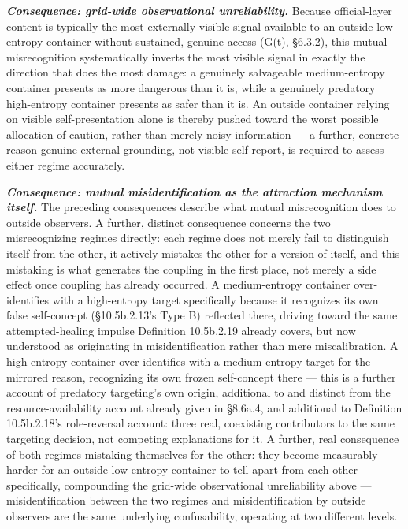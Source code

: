 \documentclass[
]{article}
\begin{document}
\emph{\textbf{Consequence: grid-wide observational unreliability.}}
Because official-layer content is typically the most externally visible
signal available to an outside low-entropy container without sustained,
genuine access (G(t), §6.3.2), this mutual misrecognition systematically
inverts the most visible signal in exactly the direction that does the
most damage: a genuinely salvageable medium-entropy container presents
as more dangerous than it is, while a genuinely predatory high-entropy
container presents as safer than it is. An outside container relying on
visible self-presentation alone is thereby pushed toward the worst
possible allocation of caution, rather than merely noisy information ---
a further, concrete reason genuine external grounding, not visible
self-report, is required to assess either regime accurately.

\emph{\textbf{Consequence: mutual misidentification as the attraction
mechanism itself.}} The preceding consequences describe what mutual
misrecognition does to outside observers. A further, distinct
consequence concerns the two misrecognizing regimes directly: each
regime does not merely fail to distinguish itself from the other, it
actively mistakes the other for a version of itself, and this mistaking
is what generates the coupling in the first place, not merely a side
effect once coupling has already occurred. A medium-entropy container
over-identifies with a high-entropy target specifically because it
recognizes its own false self-concept (§10.5b.2.13's Type B) reflected
there, driving toward the same attempted-healing impulse Definition
10.5b.2.19 already covers, but now understood as originating in
misidentification rather than mere miscalibration. A high-entropy
container over-identifies with a medium-entropy target for the mirrored
reason, recognizing its own frozen self-concept there --- this is a
further account of predatory targeting's own origin, additional to and
distinct from the resource-availability account already given in
§8.6a.4, and additional to Definition 10.5b.2.18's role-reversal
account: three real, coexisting contributors to the same targeting
decision, not competing explanations for it. A further, real consequence
of both regimes mistaking themselves for the other: they become
measurably harder for an outside low-entropy container to tell apart
from each other specifically, compounding the grid-wide observational
unreliability above --- misidentification between the two regimes and
misidentification by outside observers are the same underlying
confusability, operating at two different levels.
\end{document}
